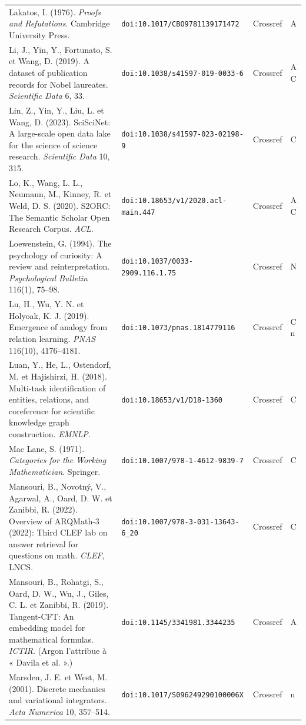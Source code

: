\documentclass[a4paper,11pt]{article}
\begin{document}
{\begin{longtable}{@{}>{\raggedright\arraybackslash}p{8.7cm}>{\raggedright\arraybackslash}p{3.6cm}>{\raggedright\arraybackslash}p{2.1cm}>{\raggedright\arraybackslash}p{0.9cm}@{}}
Lakatos, I. (1976). \emph{Proofs and Refutations}. Cambridge University Press. & \nolinkurl{doi:10.1017/CBO9781139171472} & Crossref & A\\
Li, J., Yin, Y., Fortunato, S. et Wang, D. (2019). A dataset of publication records for Nobel laureates. \emph{Scientific Data} 6, 33. & \nolinkurl{doi:10.1038/s41597-019-0033-6} & Crossref & A C\\
Lin, Z., Yin, Y., Liu, L. et Wang, D. (2023). SciSciNet: A large-scale open data lake for the science of science research. \emph{Scientific Data} 10, 315. & \nolinkurl{doi:10.1038/s41597-023-02198-9} & Crossref & C\\
Lo, K., Wang, L. L., Neumann, M., Kinney, R. et Weld, D. S. (2020). S2ORC: The Semantic Scholar Open Research Corpus. \emph{ACL}. & \nolinkurl{doi:10.18653/v1/2020.acl-main.447} & Crossref & A C\\
Loewenstein, G. (1994). The psychology of curiosity: A review and reinterpretation. \emph{Psychological Bulletin} 116(1), 75--98. & \nolinkurl{doi:10.1037/0033-2909.116.1.75} & Crossref & N\\
Lu, H., Wu, Y. N. et Holyoak, K. J. (2019). Emergence of analogy from relation learning. \emph{PNAS} 116(10), 4176--4181. & \nolinkurl{doi:10.1073/pnas.1814779116} & Crossref & C n\\
Luan, Y., He, L., Ostendorf, M. et Hajishirzi, H. (2018). Multi-task identification of entities, relations, and coreference for scientific knowledge graph construction. \emph{EMNLP}. & \nolinkurl{doi:10.18653/v1/D18-1360} & Crossref & C\\
Mac Lane, S. (1971). \emph{Categories for the Working Mathematician}. Springer. & \nolinkurl{doi:10.1007/978-1-4612-9839-7} & Crossref & C\\
Mansouri, B., Novotný, V., Agarwal, A., Oard, D. W. et Zanibbi, R. (2022). Overview of ARQMath-3 (2022): Third CLEF lab on answer retrieval for questions on math. \emph{CLEF}, LNCS. & \nolinkurl{doi:10.1007/978-3-031-13643-6_20} & Crossref & C\\
Mansouri, B., Rohatgi, S., Oard, D. W., Wu, J., Giles, C. L. et Zanibbi, R. (2019). Tangent-CFT: An embedding model for mathematical formulas. \emph{ICTIR}. (Argon l'attribue à « Davila et al. ».) & \nolinkurl{doi:10.1145/3341981.3344235} & Crossref & A\\
Marsden, J. E. et West, M. (2001). Discrete mechanics and variational integrators. \emph{Acta Numerica} 10, 357--514. & \nolinkurl{doi:10.1017/S096249290100006X} & Crossref & n\\

\end{longtable}}
\end{document}
